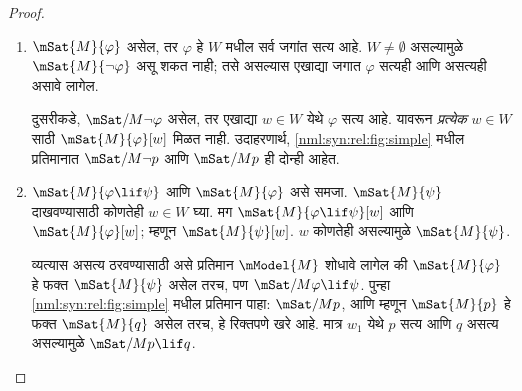 \begin{proof}
  \begin{enumerate}
  \item $\mSat{M}{\varphi}$ असेल, तर $\varphi$ हे $W$ मधील सर्व
    जगांत सत्य आहे. $W \neq \emptyset$ असल्यामुळे
    $\mSat{M}{\lnot\varphi}$ असू शकत नाही; तसे असल्यास
    एखाद्या जगात $\varphi$ सत्यही आणि असत्यही असावे लागेल.

    दुसरीकडे, $\mSat/{M}{\lnot \varphi}$ असेल, तर एखाद्या
    $w \in W$ येथे $\varphi$ सत्य आहे. यावरून \emph{प्रत्येक}
    $w \in W$ साठी $\mSat{M}{\varphi}[w]$ मिळत नाही. उदाहरणार्थ,
    \ref{nml:syn:rel:fig:simple} मधील प्रतिमानात $\mSat/{M}{\lnot p}$
    आणि $\mSat/{M}{p}$ ही दोन्ही आहेत.
  \item $\mSat{M}{\varphi \lif \psi}$ आणि $\mSat{M}{\varphi}$ असे समजा.
    $\mSat{M}{\psi}$ दाखवण्यासाठी कोणतेही $w \in W$ घ्या.
    मग $\mSat{M}{\varphi \lif \psi}[w]$ आणि $\mSat{M}{\varphi}[w]$;
    म्हणून $\mSat{M}{\psi}[w]$. $w$ कोणतेही असल्यामुळे
    $\mSat{M}{\psi}$.

    व्यत्यास असत्य ठरवण्यासाठी असे प्रतिमान $\mModel{M}$
    शोधावे लागेल की $\mSat{M}{\varphi}$ हे फक्त $\mSat{M}{\psi}$
    असेल तरच, पण $\mSat/{M}{\varphi \lif \psi}$. पुन्हा
    \ref{nml:syn:rel:fig:simple} मधील प्रतिमान पाहा: $\mSat/{M}{p}$,
    आणि म्हणून $\mSat{M}{p}$ हे फक्त $\mSat{M}{q}$ असेल
    तरच, हे रिक्तपणे खरे आहे. मात्र $w_1$ येथे $p$ सत्य
    आणि $q$ असत्य असल्यामुळे $\mSat/{M}{p \lif
      q}$.
  \end{enumerate}
\end{proof}

